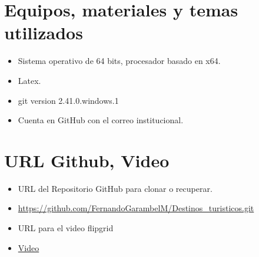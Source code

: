 \documentclass{article}
\begin{document}
\section{Equipos, materiales y temas utilizados}
	\begin{itemize}
		\item Sistema operativo de 64 bits, procesador basado en x64.
		\item Latex. 
		\item git version 2.41.0.windows.1
		\item Cuenta en GitHub con el correo institucional.
	\end{itemize}
\section{URL Github, Video}
	\begin{itemize}
		\item URL del Repositorio GitHub para clonar o recuperar.
		\item \url{https://github.com/FernandoGarambelM/Destinos_turisticos.git}
		\item URL para el video flipgrid
		\item \url{Video}	
	\end{itemize}
	\clearpage
\end{document}
